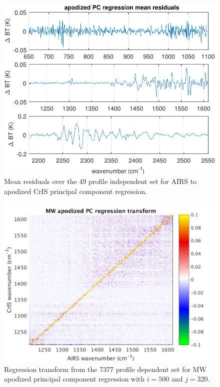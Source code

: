 \documentclass[journal]{IEEEtran}
\begin{document}
\begin{figure} %
  \centering
  \includegraphics[width=\linewidth]{figures/ap_pc_regr.pdf}
  \caption{Mean residuals over the 49 profile independent set for
    AIRS to apodized CrIS principal component regression.}
  \label{dreg6}
\end{figure}


\begin{figure} %
  \centering
  \includegraphics[width=\linewidth]{figures/MW_pc_regr_mat.png}
  \caption{Regression transform from the 7377 profile dependent set
    for MW apodized principal component regression with $i = 500$
    and $j = 320$.}
  \label{dreg8}
\end{figure}
\end{document}
